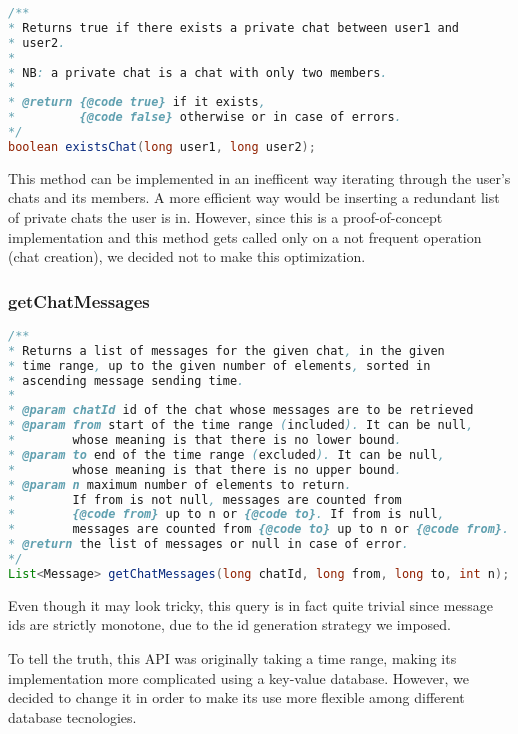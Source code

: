 \documentclass[10pt]{article}
\begin{document}
\begin{lstlisting}[language = Java]
/**
* Returns true if there exists a private chat between user1 and 
* user2.
*
* NB: a private chat is a chat with only two members.
*
* @return {@code true} if it exists, 
*         {@code false} otherwise or in case of errors.
*/
boolean existsChat(long user1, long user2);
\end{lstlisting}

This method can be implemented in an inefficent way iterating through the 
user's chats and its members. A more efficient way would be inserting a
redundant list of private chats the user is in.
However, since this is a proof-of-concept implementation and this method gets 
called only on a not frequent operation (chat creation), we decided not to
make this optimization.

\subsubsection{getChatMessages}

\begin{lstlisting}[language = Java]
/**
* Returns a list of messages for the given chat, in the given 
* time range, up to the given number of elements, sorted in 
* ascending message sending time.
*
* @param chatId id of the chat whose messages are to be retrieved
* @param from start of the time range (included). It can be null, 
*        whose meaning is that there is no lower bound.
* @param to end of the time range (excluded). It can be null, 
*        whose meaning is that there is no upper bound.
* @param n maximum number of elements to return. 
*        If from is not null, messages are counted from 
*        {@code from} up to n or {@code to}. If from is null, 
*        messages are counted from {@code to} up to n or {@code from}.
* @return the list of messages or null in case of error.
*/
List<Message> getChatMessages(long chatId, long from, long to, int n);
\end{lstlisting}

Even though it may look tricky, this query is in fact quite trivial since 
message ids are strictly monotone, due to the id generation strategy we 
imposed.

To tell the truth, this API was originally taking a time range, making its 
implementation more complicated using a key-value database. However, we 
decided to change it in order to make its use more flexible among different 
database tecnologies.
\end{document}
